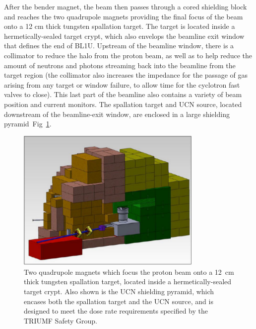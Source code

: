 After the bender magnet, the beam then passes through a cored
shielding block and reaches the two quadrupole magnets providing the
final focus of the beam onto a 12 cm thick tungsten spallation target.
The target is located inside a hermetically-sealed target crypt, which
also envelops the beamline exit window that defines the end of BL1U.
Upstream of the beamline window, there is a collimator to reduce the
halo from the proton beam, as well as to help reduce the amount of
neutrons and photons streaming back into the beamline from the target
region (the collimator also increases the impedance for the passage of
gas arising from any target or window failure, to allow time for the
cyclotron fast valves to close). This last part of the beamline also
contains a variety of beam position and current monitors. The
spallation target and UCN source, located downstream of the
beamline-exit window, are enclosed in a large shielding
pyramid~Fig~\ref{fig:pyramid}.
\begin{figure}[h!]
  \centering
  \includegraphics[width=0.8\textwidth]{pyramid.png}
  \caption{Two quadrupole magnets which focus the proton beam onto a
    12~cm thick tungsten spallation target, located inside a
    hermetically-sealed target crypt. Also shown is the UCN shielding
    pyramid, which encases both the spallation target and the UCN
    source, and is designed to meet the dose rate requirements
    specified by the TRIUMF Safety Group.}
  \label{fig:pyramid}
\end{figure}
